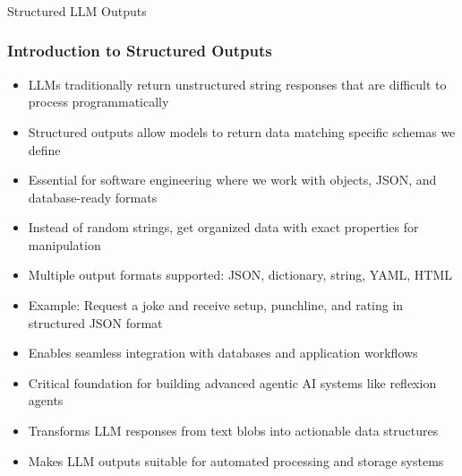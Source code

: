 \begin{frame}[fragile]\frametitle{}
\begin{center}
{\Large Structured LLM Outputs}
\end{center}
\end{frame}
\begin{frame}[fragile]\frametitle{Introduction to Structured Outputs}
      \begin{itemize}
	\item LLMs traditionally return unstructured string responses that are difficult to process programmatically
	\item Structured outputs allow models to return data matching specific schemas we define
	\item Essential for software engineering where we work with objects, JSON, and database-ready formats
	\item Instead of random strings, get organized data with exact properties for manipulation
	\item Multiple output formats supported: JSON, dictionary, string, YAML, HTML
	\item Example: Request a joke and receive setup, punchline, and rating in structured JSON format
	\item Enables seamless integration with databases and application workflows
	\item Critical foundation for building advanced agentic AI systems like reflexion agents
	\item Transforms LLM responses from text blobs into actionable data structures
	\item Makes LLM outputs suitable for automated processing and storage systems
	  \end{itemize}
\end{frame}

